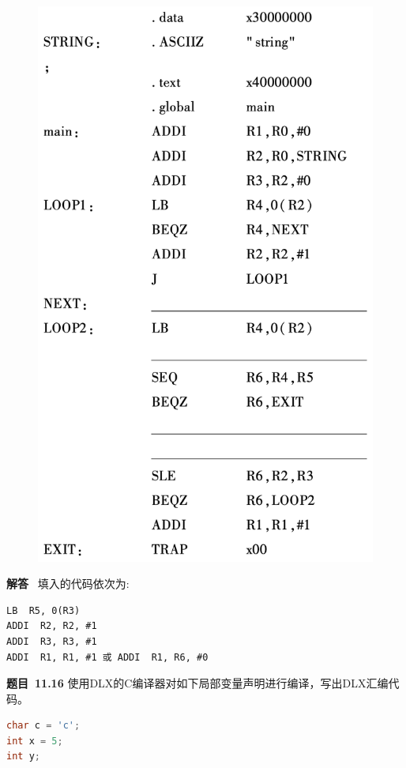\documentclass[10pt,a4paper,UTF8]{ctexart}
\newcommand{\problemname}{待定义}
\newenvironment{problem}{\begin{shaded}\par\noindent\textbf{题目\  \problemname}}{\end{shaded}\par}
\newenvironment{solution}{\par\noindent\textbf{解答}\ }{\par}
\begin{document}
\begin{figure}[H]
	\centering
	\includegraphics[scale=0.4]{img/11.14}
\end{figure}

\begin{solution}
	填入的代码依次为:
	\begin{lstlisting}
LB  R5, 0(R3)
ADDI  R2, R2, #1
ADDI  R3, R3, #1
ADDI  R1, R1, #1 或 ADDI  R1, R6, #0
	\end{lstlisting}

\end{solution}


\renewcommand{\problemname}{11.16}
\begin{problem}
	使用DLX的C编译器对如下局部变量声明进行编译，写出DLX汇编代码。
	\begin{lstlisting}[language=C]
char c = 'c';
int x = 5;
int y;
	\end{lstlisting}
\end{problem}
\end{document}
